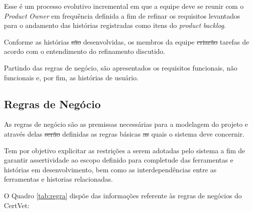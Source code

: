 \documentclass[
    12pt,               %
    openright,          %
    oneside,
    a4paper,            %
    BIBLATEX,           %
    TODO,               %
    english,            %
    brazil              %
    ]{ifsp-spo-inf-ctds}
\providecommand{\DIFadd}[1]{{\protect\color{blue}\uwave{#1}}} %
\providecommand{\DIFdel}[1]{{\protect\color{red}\sout{#1}}}                      %
\providecommand{\DIFaddbegin}{} %
\providecommand{\DIFaddend}{} %
\providecommand{\DIFdelbegin}{} %
\providecommand{\DIFdelend}{} %
\newcommand{\DIFscaledelfig}{0.5}
\newlength{\DIFdelgraphicswidth} %
\newlength{\DIFdelgraphicsheight} %
\newcommand{\DIFaddincludegraphics}[2][]{{\color{blue}\fbox{\DIFOincludegraphics[#1]{#2}}}} %
\newcommand{\DIFdelincludegraphics}[2][]{%
\sbox{\DIFdelgraphicsbox}{\DIFOincludegraphics[#1]{#2}}%
\settoboxwidth{\DIFdelgraphicswidth}{\DIFdelgraphicsbox} %
\settoboxtotalheight{\DIFdelgraphicsheight}{\DIFdelgraphicsbox} %
\scalebox{\DIFscaledelfig}{%
\parbox[b]{\DIFdelgraphicswidth}{\usebox{\DIFdelgraphicsbox}\\[-\baselineskip] \rule{\DIFdelgraphicswidth}{0em}}\llap{\resizebox{\DIFdelgraphicswidth}{\DIFdelgraphicsheight}{%
\setlength{\unitlength}{\DIFdelgraphicswidth}%
\begin{picture}(1,1)%
\thicklines\linethickness{2pt} %
{\color[rgb]{1,0,0}\put(0,0){\framebox(1,1){}}}%
{\color[rgb]{1,0,0}\put(0,0){\line( 1,1){1}}}%
{\color[rgb]{1,0,0}\put(0,1){\line(1,-1){1}}}%
\end{picture}%
}\hspace*{3pt}}} %
} %
\DeclareRobustCommand{\DIFaddbegin}{\DIFOaddbegin \let\includegraphics\DIFaddincludegraphics} %
\DeclareRobustCommand{\DIFaddend}{\DIFOaddend \let\includegraphics\DIFOincludegraphics} %
\DeclareRobustCommand{\DIFdelbegin}{\DIFOdelbegin \let\includegraphics\DIFdelincludegraphics} %
\DeclareRobustCommand{\DIFdelend}{\DIFOaddend \let\includegraphics\DIFOincludegraphics} %
\begin{document}
        Esse é um processo evolutivo incremental em que a equipe deve se reunir com o \emph{Product} \emph{Owner} em frequência definida a fim de refinar os requisitos levantados para o andamento das histórias registradas como itens do \emph{product} \emph{backlog}. 

        Conforme as histórias \DIFdelbegin \DIFdel{são }\DIFdelend \DIFaddbegin \DIFadd{foram }\DIFaddend desenvolvidas, os membros da equipe \DIFdelbegin \DIFdel{criarão }\DIFdelend \DIFaddbegin \DIFadd{criaram }\DIFaddend tarefas de acordo com o entendimento do refinamento discutido.

        Partindo das regras de negócio, são apresentados os requisitos funcionais, não funcionais e, por fim, as histórias de usuário.

         \subsection{Regras de Negócio}

            As regras de negócio são as premissas necessárias para a modelagem do projeto e através delas \DIFdelbegin \DIFdel{serão }\DIFdelend \DIFaddbegin \DIFadd{foram }\DIFaddend definidas as regras básicas \DIFdelbegin \DIFdel{as }\DIFdelend \DIFaddbegin \DIFadd{às }\DIFaddend quais o sistema deve concernir.

            Tem por objetivo explicitar as restrições a serem adotadas pelo sistema a fim de garantir assertividade ao escopo definido para completude das ferramentas e histórias em desenvolvimento, bem como as interdependências entre as ferramentas e historias relacionadas.

            O Quadro \ref{tab:regra} dispõe das informações referente às regras de negócios do CertVet:
\end{document}
